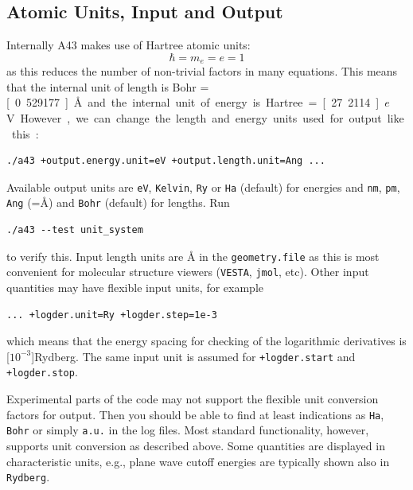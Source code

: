 \documentclass[oribibl]{llncs}
\newcommand{\ttt}[1]{\texttt{#1}}
\newcommand{\codename}{A43}
\begin{document}
\subsection{Atomic Units, Input and Output} \label{sec:units}
%
Internally \codename{} makes use of Hartree atomic units:
\begin{equation}
	\hbar = m_e = e = 1
\end{equation}
as this reduces the number of non-trivial factors in many equations.
This means that the internal unit of length is Bohr = \unit[0.529177]{\AA{}}
and the internal unit of energy is Hartree = \unit[27.2114]{$e$V}.
However, we can change the length and energy units used for output like this:
\begin{verbatim}
./a43 +output.energy.unit=eV +output.length.unit=Ang ...
\end{verbatim}
Available output units are \ttt{eV}, \ttt{Kelvin}, \ttt{Ry} or \ttt{Ha} (default) for energies 
and \ttt{nm}, \ttt{pm}, \ttt{Ang} (=\AA) and \ttt{Bohr} (default) for lengths. Run
\begin{verbatim}
./a43 --test unit_system
\end{verbatim}
to verify this.
%
Input length units are \AA{} in the \ttt{geometry.file} as this is most convenient for molecular structure viewers
(\ttt{VESTA}, \ttt{jmol}, etc). Other input quantities may have flexible input units, for example
\begin{verbatim}
... +logder.unit=Ry +logder.step=1e-3
\end{verbatim}
which means that the energy spacing for checking of the logarithmic derivatives is \unit[$10^{-3}$]{Rydberg}.
The same input unit is assumed for \ttt{+logder.start} and \ttt{+logder.stop}.

\noindent
Experimental parts of the code may not support the flexible unit conversion
factors for output. Then you should be able to find at least indications as \ttt{Ha}, \ttt{Bohr} or simply \ttt{a.u.} in the log files.
Most standard functionality, however, supports unit conversion as described above.
Some quantities are displayed in characteristic units, e.g., plane wave cutoff energies are typically shown also in \ttt{Rydberg}.
\end{document}
